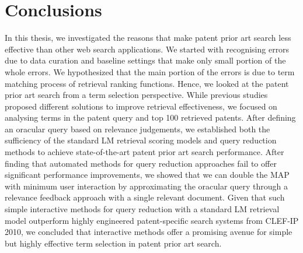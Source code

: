 \chapter{Conclusions}
\label{cha:conc}


In this thesis, we investigated the reasons that make patent prior art search 
less effective than other web search applications.
We started with recognising errors due to data curation and baseline settings that 
make only small portion of the whole errors. We hypothesized that the main portion of the errors is 
due to term matching process of retrieval ranking functions. 
Hence, we looked at the patent prior art search from
a term selection perspective. While previous studies proposed
different solutions to improve retrieval effectiveness, we 
focused on analysing terms in the patent query and top 100 retrieved patents. 
After defining an oracular query based on
relevance judgements, we established both the sufficiency
of the standard LM retrieval scoring models and query reduction 
methods to achieve state-of-the-art patent prior art
search performance. After finding that automated methods 
for query reduction approaches fail to offer significant
performance improvements, we showed that we can double
the MAP with minimum user interaction by approximating
the oracular query through a relevance feedback approach
with a single relevant document. Given that such simple 
interactive methods for query reduction with a standard LM
retrieval model outperform highly engineered patent-specific
search systems from CLEF-IP 2010, we concluded that interactive 
methods offer a promising avenue for simple but
highly effective term selection in patent prior art search.
 

